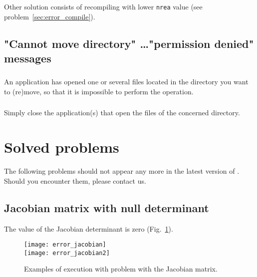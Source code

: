 Other solution consists of recompiling with lower \texttt{nrea} value (see problem~\ref{sec:error_compile}).


\subsection{"Cannot move directory" \ldots "permission denied" messages}



\subsubsection{\question}

An application has opened one or several files located in the directory you want to (re)move, so that it is impossible to perform the operation.

\subsubsection{\answer}

Simply close the application(s) that open the files of the concerned directory.


\section{Solved problems}


The following problems should not appear any more in the latest version of \diva. Should you encounter them, please contact us.


\subsection{Jacobian matrix with null determinant}

The value of the Jacobian determinant is zero (Fig.~\ref{fig:error_jacobian}).
\begin{figure}[htpb]
\centering
\texttt{[image: error\_jacobian]}\\
\texttt{[image: error\_jacobian2]}
\caption{Examples of \diva execution with problem with the Jacobian matrix. \label{fig:error_jacobian}}
\end{figure}

